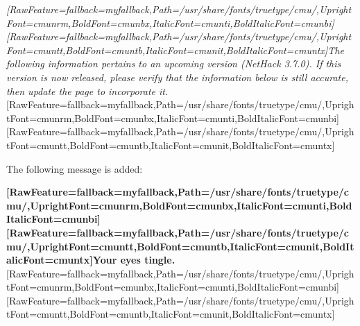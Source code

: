 
{\itshape \allowbreak{}\setmainfont{cmunti.ttf}[RawFeature={fallback=myfallback},Path=/usr/share/fonts/truetype/cmu/,UprightFont=cmunrm,BoldFont=cmunbx,ItalicFont=cmunti,BoldItalicFont=cmunbi]\setmonofont{cmunti.ttf}[RawFeature={fallback=myfallback},Path=/usr/share/fonts/truetype/cmu/,UprightFont=cmuntt,BoldFont=cmuntb,ItalicFont=cmunit,BoldItalicFont=cmuntx]\itshape The following information pertains to an upcoming version (NetHack 3.7.0\footnotemark[63]). If this version is now released, please verify that the information below is still accurate, then update the page to incorporate it.}\allowbreak{}\setmainfont{cmunrm.ttf}[RawFeature={fallback=myfallback},Path=/usr/share/fonts/truetype/cmu/,UprightFont=cmunrm,BoldFont=cmunbx,ItalicFont=cmunti,BoldItalicFont=cmunbi]\setmonofont{cmunrm.ttf}[RawFeature={fallback=myfallback},Path=/usr/share/fonts/truetype/cmu/,UprightFont=cmuntt,BoldFont=cmuntb,ItalicFont=cmunit,BoldItalicFont=cmuntx]


The following message is added: 



{\bfseries \allowbreak{}\setmainfont{cmunbx.ttf}[RawFeature={fallback=myfallback},Path=/usr/share/fonts/truetype/cmu/,UprightFont=cmunrm,BoldFont=cmunbx,ItalicFont=cmunti,BoldItalicFont=cmunbi]\setmonofont{cmunbx.ttf}[RawFeature={fallback=myfallback},Path=/usr/share/fonts/truetype/cmu/,UprightFont=cmuntt,BoldFont=cmuntb,ItalicFont=cmunit,BoldItalicFont=cmuntx]\bfseries {}Your eyes tingle.}\allowbreak{}\setmainfont{cmunrm.ttf}[RawFeature={fallback=myfallback},Path=/usr/share/fonts/truetype/cmu/,UprightFont=cmunrm,BoldFont=cmunbx,ItalicFont=cmunti,BoldItalicFont=cmunbi]\setmonofont{cmunrm.ttf}[RawFeature={fallback=myfallback},Path=/usr/share/fonts/truetype/cmu/,UprightFont=cmuntt,BoldFont=cmuntb,ItalicFont=cmunit,BoldItalicFont=cmuntx]

